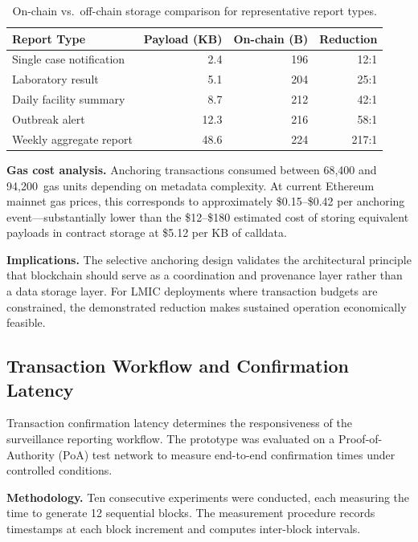 \documentclass[AMA,LATO1COL]{WileyNJD-v2}
\begin{document}
\begin{table}[!ht]
\caption{On-chain vs.\ off-chain storage comparison for representative report types.}\label{tab:storage}
\centering
\small
\begin{tabular}{p{2.8cm}rrr}
\toprule
\textbf{Report Type} & \textbf{Payload (KB)} & \textbf{On-chain (B)} & \textbf{Reduction} \\
\midrule
Single case notification & 2.4 & 196 & 12:1 \\
Laboratory result & 5.1 & 204 & 25:1 \\
Daily facility summary & 8.7 & 212 & 42:1 \\
Outbreak alert & 12.3 & 216 & 58:1 \\
Weekly aggregate report & 48.6 & 224 & 217:1 \\
\bottomrule
\end{tabular}
\end{table}

\textbf{Gas cost analysis.} Anchoring transactions consumed between 68,400 and 94,200~gas units depending on metadata complexity. At current Ethereum mainnet gas prices, this corresponds to approximately \$0.15--\$0.42 per anchoring event---substantially lower than the \$12--\$180 estimated cost of storing equivalent payloads in contract storage at \$5.12 per KB of calldata.

\textbf{Implications.} The selective anchoring design validates the architectural principle that blockchain should serve as a coordination and provenance layer rather than a data storage layer. For LMIC deployments where transaction budgets are constrained, the demonstrated reduction makes sustained operation economically feasible.

\subsection{Transaction Workflow and Confirmation Latency}\label{subsec:latency_eval}

Transaction confirmation latency determines the responsiveness of the surveillance reporting workflow. The prototype was evaluated on a Proof-of-Authority (PoA) test network to measure end-to-end confirmation times under controlled conditions.

\textbf{Methodology.} Ten consecutive experiments were conducted, each measuring the time to generate 12 sequential blocks. The measurement procedure records timestamps at each block increment and computes inter-block intervals.
\end{document}
